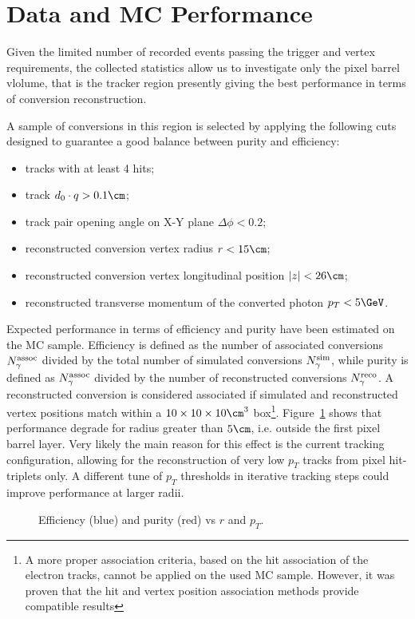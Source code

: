 \section{Data and MC Performance}
\label{dataVsMc}
Given the limited number of recorded events passing the trigger and
vertex requirements, the collected statistics allow us to investigate
only the pixel barrel vlolume, that is the tracker region presently
giving the best performance in terms of conversion reconstruction.

A sample of conversions in this region is selected by applying the
following cuts designed to guarantee a good balance between purity and
efficiency:
\begin{itemize}
\item tracks with at least 4 hits;
\item track $d_0\cdot q > 0.1\cm$;
\item track pair opening angle on X-Y plane $\Delta\phi<0.2$;
\item reconstructed conversion vertex radius $r<15\cm$;
\item reconstructed conversion vertex longitudinal position $|z|< 26\cm$;
\item reconstructed transverse momentum of the converted photon $p_T<5\GeV$.
\end{itemize}

Expected performance in terms of efficiency and purity have been
estimated on the MC sample.
Efficiency is defined as the number of associated conversions
$N^{\rm assoc}_{\gamma}$ divided by the total number of simulated
conversions $N^{\rm sim}_{\gamma}$, while purity is defined as
$N^{\rm assoc}_{\gamma}$ divided by the number of reconstructed
conversions $N^{\rm reco}_{\gamma}$.
A reconstructed conversion is considered associated if simulated and reconstructed vertex positions match within a $10\times10\times10\cm^3$ 
box\footnote{A more proper association criteria, based on the hit
  association of the electron tracks, cannot be applied on the used MC
  sample. However, it was proven that the hit and vertex position
  association methods provide compatible results}.
Figure~\ref{efficpurity} shows that performance degrade for radius greater than $5\cm$, i.e. outside the first pixel barrel layer.
Very likely the main reason for this effect is the current tracking configuration, allowing for the reconstruction of very low $p_T$ tracks from
pixel hit-triplets only. A different tune of $p_T$ thresholds in iterative tracking steps could improve performance at larger radii.
\begin{figure}[!hbtp]
\caption{Efficiency (blue) and purity (red) vs $r$ and $p_T$.}
\label{efficpurity}
\end{figure}

